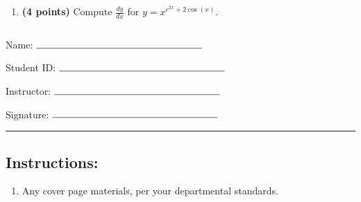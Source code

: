 \documentclass[12pt]{amsart}
\begin{document}
\begin{enumerate}
\vfill 
\def \varexp{2}\def \newexp{1}\def \trigcoeff{2}\def \trigval{+2}\def \oppval{-2}
\item {\bf (4 points)} 
 Compute $\frac{dy}{dx}$ for $y=x^{e^{\varexp x} \trigval \cos(x)}$.

\vfill 
\newpage  $ $   \newpage\end{enumerate}\graphicspath{{C:/Users/iainc/anaconda3/Randomizer/MATH 1001/Midterm 1/}}\setcounter{page}{1}


\thispagestyle{fancy}

 
\noindent Name: $\rule{6cm}{0.15mm}$

\vspace{.2cm}

\noindent Student ID: $\rule{6cm}{0.15mm}$

\vspace{.2cm}

\noindent Instructor: $\rule{6cm}{0.15mm}$

\vspace{.2cm}

\noindent Signature: $\rule{6cm}{0.15mm}$
 



\vspace{.4cm}


\vspace{.4cm}

\hrule

\subsection*{Instructions:} \begin{enumerate}[1.]
\item Any cover page materials, per your departmental standards.
\end{enumerate}
\end{document}
